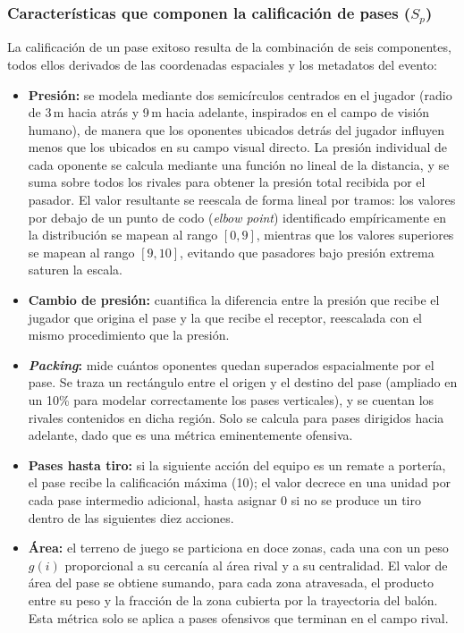 \documentclass[conference]{IEEEtran}
\begin{document}
\subsubsection{Características que componen la calificación de pases ($S_p$)}
La calificación de un pase exitoso resulta de la combinación de seis componentes, todos ellos derivados de las coordenadas espaciales y los metadatos del evento:
\begin{itemize}
    \item \textbf{Presión:} se modela mediante dos semicírculos centrados en el jugador (radio de 3\,m hacia atrás y 9\,m hacia adelante, inspirados en el campo de visión humano), de manera que los oponentes ubicados detrás del jugador influyen menos que los ubicados en su campo visual directo. La presión individual de cada oponente se calcula mediante una función no lineal de la distancia, y se suma sobre todos los rivales para obtener la presión total recibida por el pasador. El valor resultante se reescala de forma lineal por tramos: los valores por debajo de un punto de codo (\textit{elbow point}) identificado empíricamente en la distribución se mapean al rango $[0,9]$, mientras que los valores superiores se mapean al rango $[9,10]$, evitando que pasadores bajo presión extrema saturen la escala.
    \item \textbf{Cambio de presión:} cuantifica la diferencia entre la presión que recibe el jugador que origina el pase y la que recibe el receptor, reescalada con el mismo procedimiento que la presión.
    \item \textbf{\textit{Packing}:} mide cuántos oponentes quedan superados espacialmente por el pase. Se traza un rectángulo entre el origen y el destino del pase (ampliado en un 10\% para modelar correctamente los pases verticales), y se cuentan los rivales contenidos en dicha región. Solo se calcula para pases dirigidos hacia adelante, dado que es una métrica eminentemente ofensiva.
    \item \textbf{Pases hasta tiro:} si la siguiente acción del equipo es un remate a portería, el pase recibe la calificación máxima (10); el valor decrece en una unidad por cada pase intermedio adicional, hasta asignar 0 si no se produce un tiro dentro de las siguientes diez acciones.
    \item \textbf{Área:} el terreno de juego se particiona en doce zonas, cada una con un peso $g(i)$ proporcional a su cercanía al área rival y a su centralidad. El valor de área del pase se obtiene sumando, para cada zona atravesada, el producto entre su peso y la fracción de la zona cubierta por la trayectoria del balón. Esta métrica solo se aplica a pases ofensivos que terminan en el campo rival.

\end{itemize}
\end{document}
